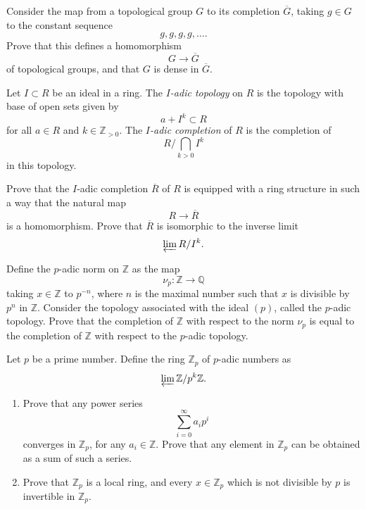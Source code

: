 \begin{exercise}
\label{exercise-dense-map-to-completion}
Consider the map from a topological
group $G$ to its completion
$\overline G$, taking $g \in G$ to the
constant sequence
$$
g,g,g,g,\ldots .
$$
Prove that this defines a homomorphism
$$
G \to \overline G
$$
of topological groups, and that $G$ is
dense in $\overline G$.
\end{exercise}

\begin{definition}
\label{definition-i-adic-topology}
Let $I \subset R$ be an ideal in a
ring. The {\it $I$-adic topology} on
$R$ is the topology with base of open
sets given by
$$
a+I^k \subset R
$$
for all $a \in R$ and
$k \in \mathbb Z_{>0}$. The
{\it $I$-adic completion} of $R$ is
the completion of
$$
R/\bigcap_{k>0}I^k
$$
in this topology.
\end{definition}

\begin{exercise}
\label{exercise-i-adic-completion-ring}
Prove that the $I$-adic completion
$\overline R$ of $R$ is equipped with
a ring structure in such a way that
the natural map
$$
R \to \overline R
$$
is a homomorphism. Prove that
$\overline R$ is isomorphic to the
inverse limit
$$
\varprojlim R/I^k.
$$
\end{exercise}

\begin{exercise}
\label{exercise-p-adic-topology-completion}
Define the $p$-adic norm on
$\mathbb Z$ as the map
$$
\nu_p:\mathbb Z \to \mathbb Q
$$
taking $x \in \mathbb Z$ to $p^{-n}$,
where $n$ is the maximal number such
that $x$ is divisible by $p^n$ in
$\mathbb Z$. Consider the topology
associated with the ideal $(p)$, called
the $p$-adic topology. Prove that the
completion of $\mathbb Z$ with respect
to the norm $\nu_p$ is equal to the
completion of $\mathbb Z$ with respect
to the $p$-adic topology.
\end{exercise}

\begin{exercise}
\label{exercise-zp-as-inverse-limit}
Let $p$ be a prime number. Define the
ring $\mathbb Z_p$ of $p$-adic numbers
as
$$
\varprojlim \mathbb Z/p^k\mathbb Z.
$$

\begin{enumerate}
\item Prove that any power series
$$
\sum_{i=0}^{\infty}a_ip^i
$$
converges in $\mathbb Z_p$, for any
$a_i \in \mathbb Z$. Prove that any
element in $\mathbb Z_p$ can be
obtained as a sum of such a series.

\item Prove that $\mathbb Z_p$ is a
local ring, and every
$x \in \mathbb Z_p$ which is not
divisible by $p$ is invertible in
$\mathbb Z_p$.
\end{enumerate}
\end{exercise}

